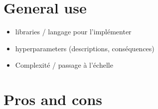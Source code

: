 \documentclass[fleqn,10pt]{SelfArx} %
\begin{document}
\flushbottom %

\maketitle %

\tableofcontents %

\thispagestyle{empty} %


\section*{General use} %


\begin{itemize}[noitemsep] %
\item libraries  / langage pour l'impl\'ementer
\item hyperparameters (descriptions, cons\'equences)
\item Complexit\'e /  passage \`a l’\'echelle
\end{itemize}

\lipsum[1] %

\section{Pros and cons}

\end{document}
